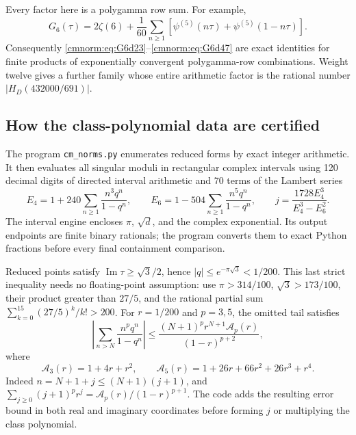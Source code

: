Every factor here is a polygamma row sum. For example,
\[
 G_6(\tau)=2\zeta(6)+\frac1{60}
  \sum_{n\geq1}\left[\psi^{(5)}(n\tau)
                         +\psi^{(5)}(1-n\tau)\right].
\]
Consequently \eqref{cmnorm:eq:G6d23}--\eqref{cmnorm:eq:G6d47}
are exact identities for finite products of exponentially convergent
polygamma-row combinations. Weight twelve gives a further family whose
entire arithmetic factor is the rational number
$|H_D(432000/691)|$.

\subsection{How the class-polynomial data are certified}
\label{cmnorm:sec:certification}

The program \texttt{cm\_norms.py} enumerates reduced forms by exact
integer arithmetic. It then evaluates all singular moduli in rectangular
complex intervals using 120 decimal digits of directed interval
arithmetic and 70 terms of the Lambert series
\[
 E_4=1+240\sum_{n\geq1}\frac{n^3q^n}{1-q^n},\qquad
 E_6=1-504\sum_{n\geq1}\frac{n^5q^n}{1-q^n},\qquad
 j=\frac{1728E_4^3}{E_4^3-E_6^2}.
\]
The interval engine encloses $\pi$, $\sqrt d$, and the complex
exponential. Its output endpoints are finite binary rationals; the
program converts them to exact Python fractions before every final
containment comparison.

Reduced points satisfy $\operatorname{Im}\tau\geq\sqrt3/2$, hence
$|q|\leq e^{-\pi\sqrt3}<1/200$. This last strict inequality needs
no floating-point assumption: use $\pi>314/100$,
$\sqrt3>173/100$, their product greater than $27/5$, and the rational
partial sum $\sum_{k=0}^{15}(27/5)^k/k!>200$.
For $r=1/200$ and $p=3,5$, the omitted tail satisfies
\begin{equation}
 \left|\sum_{n>N}\frac{n^pq^n}{1-q^n}\right|
 \leq\frac{(N+1)^p r^{N+1}\mathcal A_p(r)}{(1-r)^{p+2}},
 \label{cmnorm:eq:tail}
\end{equation}
where
\[
 \mathcal A_3(r)=1+4r+r^2,\qquad
 \mathcal A_5(r)=1+26r+66r^2+26r^3+r^4.
\]
Indeed $n=N+1+j\leq(N+1)(j+1)$, and
$\sum_{j\geq0}(j+1)^pr^j=\mathcal A_p(r)/(1-r)^{p+1}$.
The code adds the resulting error bound in both real and imaginary
coordinates before forming $j$ or multiplying the class polynomial.

